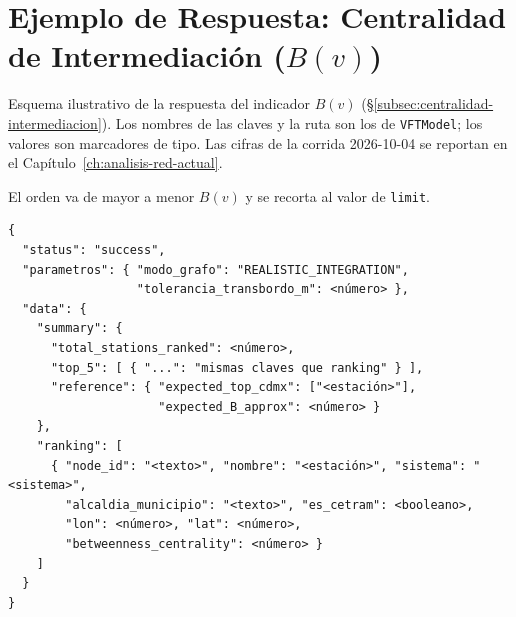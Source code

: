 
\section{Ejemplo de Respuesta: Centralidad de Intermediación \texorpdfstring{($B(v)$)}{(B(v))}}
\label{anx:vft-out-betweenness}

Esquema ilustrativo de la respuesta del indicador $B(v)$
(§\ref{subsec:centralidad-intermediacion}). Los nombres de las claves y la ruta son los
de \texttt{VFTModel}; los valores son marcadores de tipo. Las cifras de la
corrida 2026-10-04 se reportan en el Capítulo~\ref{ch:analisis-red-actual}.

El orden va de mayor a menor $B(v)$ y se recorta al valor de \texttt{limit}.

\begin{lstlisting}[style=estiloPython,
  caption={Esquema de respuesta del endpoint
           \texttt{/topological/betweenness-centrality} (ilustrativo).},
  label=lst:out-betweenness]
{
  "status": "success",
  "parametros": { "modo_grafo": "REALISTIC_INTEGRATION",
                  "tolerancia_transbordo_m": <número> },
  "data": {
    "summary": {
      "total_stations_ranked": <número>,
      "top_5": [ { "...": "mismas claves que ranking" } ],
      "reference": { "expected_top_cdmx": ["<estación>"],
                     "expected_B_approx": <número> }
    },
    "ranking": [
      { "node_id": "<texto>", "nombre": "<estación>", "sistema": "<sistema>",
        "alcaldia_municipio": "<texto>", "es_cetram": <booleano>,
        "lon": <número>, "lat": <número>,
        "betweenness_centrality": <número> }
    ]
  }
}
\end{lstlisting}
